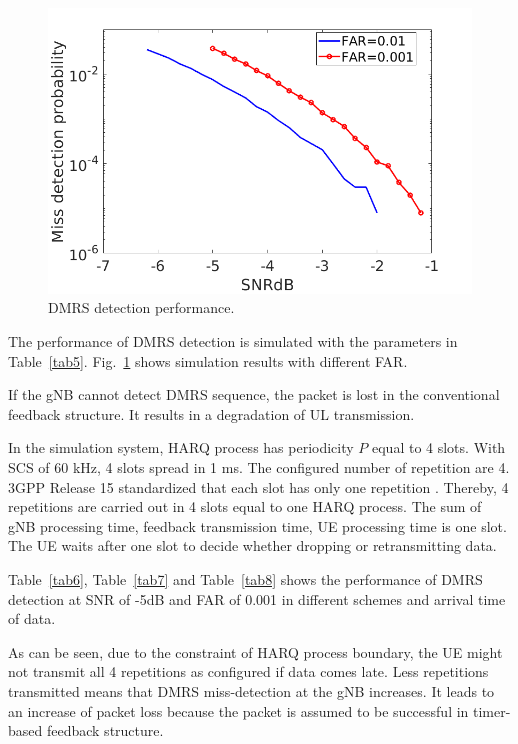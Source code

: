 \documentclass{ieeeaccess}
\begin{document}
\begin{figure}[htbp]
\centerline{\includegraphics[scale=0.22]{fig15.png}}
\caption{DMRS detection performance.}
\label{fig15}

\end{figure}

The performance of DMRS detection is simulated with the parameters in Table~\ref{tab5}. Fig.~\ref{fig15} shows simulation results with different FAR. 

If the gNB cannot detect DMRS sequence, the packet is lost in the conventional feedback structure. It results in a degradation of UL transmission.

In the simulation system, HARQ process has periodicity $P$ equal to 4 slots. With SCS of 60 kHz, 4 slots spread in 1 ms. The configured number of repetition are 4. 3GPP Release 15 standardized that each slot has only one repetition \cite{ref3}. Thereby, 4 repetitions are carried out in 4 slots equal to one HARQ process. The sum of gNB processing time, feedback transmission time, UE processing time is one slot. The UE waits after one slot to decide whether dropping or retransmitting data.

Table~\ref{tab6}, Table~\ref{tab7} and Table~\ref{tab8} shows the performance of DMRS detection at SNR of -5dB and FAR of 0.001 in different schemes and arrival time of data. 

As can be seen, due to the constraint of HARQ process boundary, the UE might not transmit all 4 repetitions as configured if data comes late. Less repetitions transmitted means that DMRS miss-detection at the gNB increases. It leads to an increase of packet loss because the packet is assumed to be successful in timer-based feedback structure.
\end{document}
